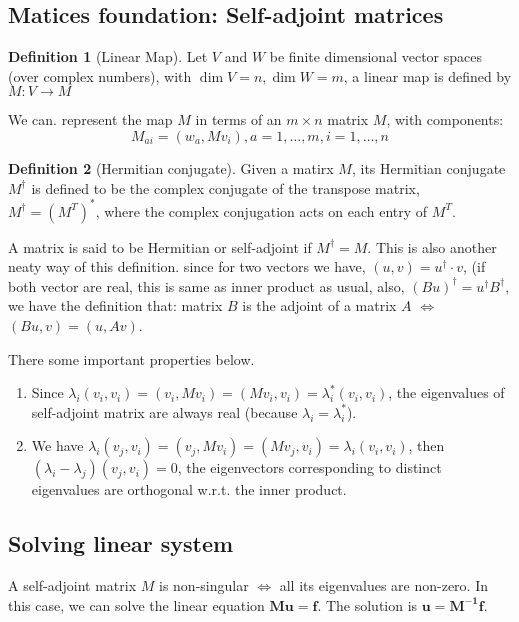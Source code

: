\documentclass{article}
\theoremstyle{definition}
\newtheorem{definition}{Definition}[section]
\begin{document}
\subsection{Matices foundation: Self-adjoint matrices}
\begin{definition}[Linear Map]
Let $V$ and $W$ be finite dimensional vector spaces (over complex numbers), with $\dim{V}=n,\dim{W}=m$, a linear map is defined by $M:V\to M$
\end{definition}

We can. represent the map $M$ in terms of an $m\times n $ matrix $M$, with components:
\begin{equation}
M_{ai}=(w_a,Mv_i), a=1,\ldots,m, i=1,\ldots,n
\end{equation}

\begin{definition}[Hermitian conjugate]
Given a matirx $M$, its Hermitian conjugate $M^{\dag}$ is defined to be the complex conjugate of the transpose matrix, $M^{\dag}=(M^{T})^{*}$, where the complex conjugation acts on each entry of $M^{T}$.
\end{definition}

A matrix is said to be Hermitian or self-adjoint if $M^{\dag}=M$. This is also another neaty way of this definition. since for two vectors we have, $(u,v)=u^{\dag} \cdot v$, (if both vector are real, this is same as inner product as usual, also, $(Bu)^{\dag}=u^{\dag}B^{\dag}$, we have the definition that: matrix $B$ is the adjoint of a matrix $A$ $\iff$ $(Bu,v)=(u,Av)$. 

There some important properties below.

\begin{enumerate}
	\item Since $\lambda_i(v_i,v_i)=(v_i,Mv_i)=(Mv_i,v_i)=\lambda_i^{*}(v_i,v_i)$, the eigenvalues of self-adjoint matrix are always real (because $\lambda_i=\lambda_i^{*}$).
	\item We have $\lambda_i(v_j,v_i)=(v_j,Mv_i)=(Mv_j,v_i)=\lambda_i(v_i,v_i)$, then $(\lambda_i-\lambda_j)(v_j,v_i)=0$, the eigenvectors corresponding to distinct eigenvalues are orthogonal w.r.t. the inner product.
\end{enumerate}

\subsection{Solving linear system}

A self-adjoint matrix $M$ is non-singular $\iff$ all its eigenvalues are non-zero. In this case, we can solve the linear equation $\mathbf{Mu}=\mathbf{f}$. The solution is $\mathbf{u}=\mathbf{M^{-1}f}$. 
\end{document}

